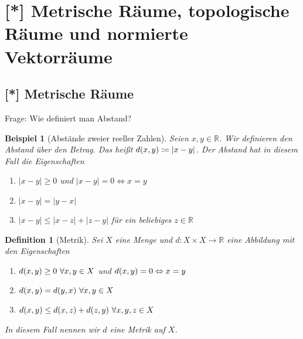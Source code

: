 \documentclass[11pt, twoside, a4paper]{article}
\theoremstyle{plain}
\newtheorem{definition}[blockelement]{Definition}
\newtheorem{beispiel}[blockelement]{Beispiel}
\numberwithin{equation}{subsection}
\newcommand{\of}[1]{\mathopen{}\mathclose{}\bgroup\left(#1\aftergroup\egroup\right)}
\newcommand{\abs}[1]{\left\lvert#1\right\rvert}
\newcommand{\equivalent}[0]{\Leftrightarrow{}}
\newcommand{\fromto}{\rightarrow{}}
\newcommand{\R}{\mathbb{R}}
\begin{document}
    \newpage


    \section{[*] Metrische Räume, topologische Räume und normierte Vektorräume}

    \subsection{[*] Metrische Räume}
    \thispagestyle{pagenumberonly}

    \marginnote{[07. Jun]}
    Frage: Wie definiert man Abstand?

    \begin{beispiel}[Abstände zweier reeller Zahlen]
        Seien $x,y\in\R$. Wir definieren den Abstand über den Betrag. Das heißt $d\of{x,y}\coloneqq \abs{x-y}$.
        Der Abstand hat in diesem Fall die Eigenschaften
        \begin{enumerate}[label=(\roman*)]
            \item $\abs{x-y} \geq 0$ und $\abs{x-y} = 0 \equivalent x=y$
            \item $\abs{x-y} = \abs{y-x}$
            \item $\abs{x-y} \leq \abs{x-z} + \abs{z-y}$ für ein beliebiges $z\in\R$
        \end{enumerate}
    \end{beispiel}

    \begin{definition}[Metrik]
        Sei $X$ eine Menge und $d: X \times X\fromto \R$ eine Abbildung mit den Eigenschaften
        \begin{enumerate}[label=(\roman*)]
            \item $d\of{x,y} \geq 0~\forall x,y\in X$ und $d\of{x,y} = 0\equivalent x = y$
            \item $d\of{x,y} = d\of{y,x}~\forall x,y\in X$
            \item $d\of{x,y} \leq d\of{x,z} + d\of{z,y}~\forall x,y,z\in X$
        \end{enumerate}
        In diesem Fall nennen wir $d$ eine Metrik auf $X$.
    \end{definition}
\end{document}
